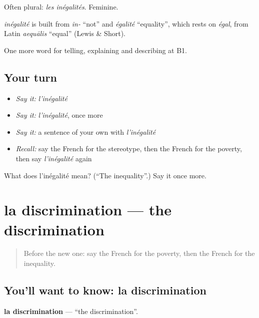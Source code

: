 Often plural: \emph{les inégalités}. Feminine.

\begin{cousinweb}
\emph{inégalité} is built from \emph{in-} \textquotedblleft{}not\textquotedblright{} and \emph{égalité} \textquotedblleft{}equality\textquotedblright{}, which rests on \emph{égal}, from Latin \emph{aequālis} \textquotedblleft{}equal\textquotedblright{} (Lewis \& Short).
\end{cousinweb}

\begin{grammarlens}[title={What you've built}]
One more word for telling, explaining and describing at B1.
\end{grammarlens}

\subsection*{Your turn}
\begin{itemize}
\raggedright
  \item \emph{Say it:} \emph{l'inégalité}
  \item \emph{Say it:} \emph{l'inégalité}, once more
  \item \emph{Say it:} a sentence of your own with \emph{l'inégalité}
  \item \emph{Recall:} say the French for the stereotype, then the French for the poverty, then say \emph{l'inégalité} again
\end{itemize}

\begin{tcolorbox}[breakable,colback=teal!4,colframe=teal!35!black,title={Before you move on}]
What does l'inégalité mean? (\textquotedblleft{}The inequality\textquotedblright{}.) Say it once more.
\end{tcolorbox}
\section[la discrimination]{la discrimination — the discrimination}

\label{lesson:FR-C365-discrimination}



\begin{quote}
Before the new one: say the French for the poverty, then the French for the inequality.
\end{quote}

\subsection*{You'll want to know: la discrimination}
\textbf{la discrimination} — \textquotedblleft{}the discrimination\textquotedblright{}.

